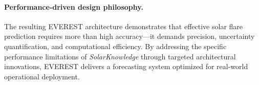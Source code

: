 \paragraph{Performance-driven design philosophy.}
The resulting \textsc{EVEREST} architecture demonstrates that effective solar flare prediction requires more than high accuracy—it demands precision, uncertainty quantification, and computational efficiency. By addressing the specific performance limitations of \textit{SolarKnowledge} through targeted architectural innovations, \textsc{EVEREST} delivers a forecasting system optimized for real-world operational deployment. 